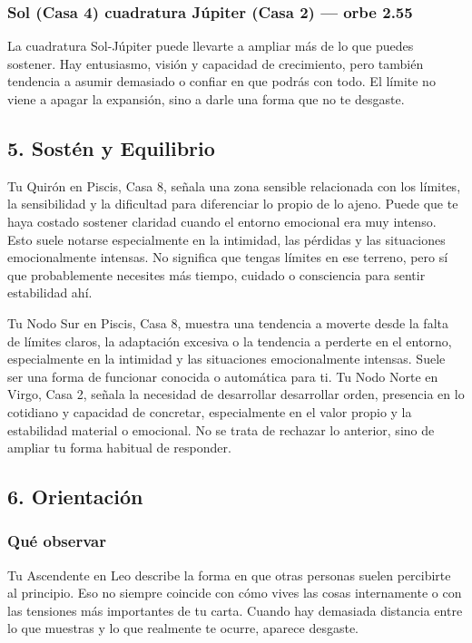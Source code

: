 \documentclass[11pt,a4paper]{article}
\begin{document}
\subsubsection*{Sol (Casa 4) cuadratura Júpiter (Casa 2) --- orbe 2.55\textdegree}
La cuadratura Sol-Júpiter puede llevarte a ampliar más de lo que puedes sostener. Hay entusiasmo, visión y capacidad de crecimiento, pero también tendencia a asumir demasiado o confiar en que podrás con todo. El límite no viene a apagar la expansión, sino a darle una forma que no te desgaste.



\subsection{5. Sostén y Equilibrio}

Tu Quirón en Piscis, Casa 8, señala una zona sensible relacionada con los límites, la sensibilidad y la dificultad para diferenciar lo propio de lo ajeno. Puede que te haya costado sostener claridad cuando el entorno emocional era muy intenso. Esto suele notarse especialmente en la intimidad, las pérdidas y las situaciones emocionalmente intensas. No significa que tengas límites en ese terreno, pero sí que probablemente necesites más tiempo, cuidado o consciencia para sentir estabilidad ahí.

\vspace{0.3cm}
Tu Nodo Sur en Piscis, Casa 8, muestra una tendencia a moverte desde la falta de límites claros, la adaptación excesiva o la tendencia a perderte en el entorno, especialmente en la intimidad y las situaciones emocionalmente intensas. Suele ser una forma de funcionar conocida o automática para ti. Tu Nodo Norte en Virgo, Casa 2, señala la necesidad de desarrollar desarrollar orden, presencia en lo cotidiano y capacidad de concretar, especialmente en el valor propio y la estabilidad material o emocional. No se trata de rechazar lo anterior, sino de ampliar tu forma habitual de responder.

\vspace{0.3cm}


\subsection{6. Orientación}

\subsubsection*{Qué observar}
Tu Ascendente en Leo describe la forma en que otras personas suelen percibirte al principio. Eso no siempre coincide con cómo vives las cosas internamente o con las tensiones más importantes de tu carta. Cuando hay demasiada distancia entre lo que muestras y lo que realmente te ocurre, aparece desgaste.
\end{document}
